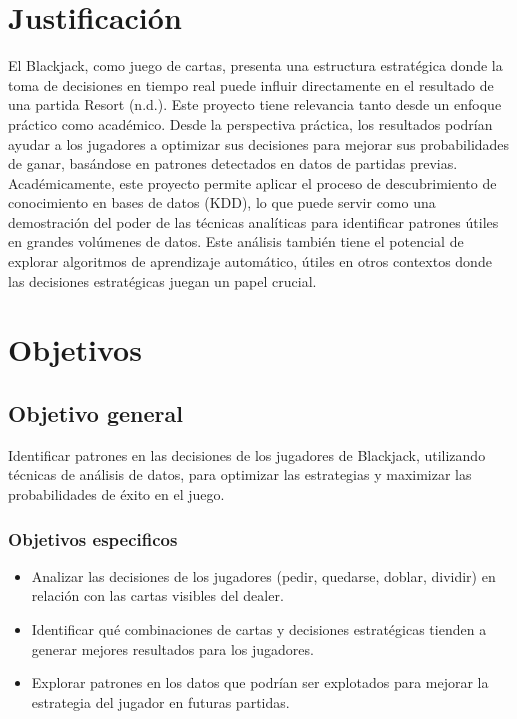 \documentclass[conference,final,]{IEEEtran}
\providecommand{\tightlist}{%
  \setlength{\itemsep}{0pt}\setlength{\parskip}{0pt}}
\begin{document}
\section{Justificación}\label{justificaciuxf3n}

El Blackjack, como juego de cartas, presenta una estructura estratégica
donde la toma de decisiones en tiempo real puede influir directamente en
el resultado de una partida Resort (n.d.). Este proyecto tiene
relevancia tanto desde un enfoque práctico como académico. Desde la
perspectiva práctica, los resultados podrían ayudar a los jugadores a
optimizar sus decisiones para mejorar sus probabilidades de ganar,
basándose en patrones detectados en datos de partidas previas.
Académicamente, este proyecto permite aplicar el proceso de
descubrimiento de conocimiento en bases de datos (KDD), lo que puede
servir como una demostración del poder de las técnicas analíticas para
identificar patrones útiles en grandes volúmenes de datos. Este análisis
también tiene el potencial de explorar algoritmos de aprendizaje
automático, útiles en otros contextos donde las decisiones estratégicas
juegan un papel crucial.

\section{Objetivos}\label{objetivos}

\subsection{Objetivo general}\label{objetivo-general}

Identificar patrones en las decisiones de los jugadores de Blackjack,
utilizando técnicas de análisis de datos, para optimizar las estrategias
y maximizar las probabilidades de éxito en el juego.

\subsubsection{Objetivos especificos}\label{objetivos-especificos}

\begin{itemize}
\tightlist
\item
  Analizar las decisiones de los jugadores (pedir, quedarse, doblar,
  dividir) en relación con las cartas visibles del dealer.
\item
  Identificar qué combinaciones de cartas y decisiones estratégicas
  tienden a generar mejores resultados para los jugadores.
\item
  Explorar patrones en los datos que podrían ser explotados para mejorar
  la estrategia del jugador en futuras partidas.
\end{itemize}
\end{document}
